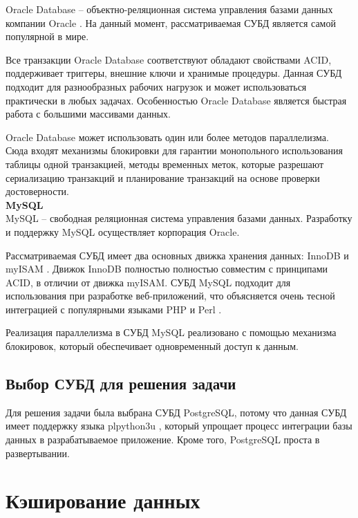 Oracle Database \cite{oracle} -- объектно-реляционная система управления базами данных компании Oracle \cite{oracle-company}. На данный момент, рассматриваемая СУБД является самой популярной в мире. \cite{oracle-popular}

Все транзакции Oracle Database соответствуют обладают свойствами ACID, поддерживает триггеры, внешние ключи и хранимые процедуры. Данная СУБД подходит для разнообразных рабочих нагрузок и может использоваться практически в любых задачах. Особенностью Oracle Database является быстрая работа с большими массивами данных.

Oracle Database может использовать один или более методов параллелизма. Сюда входят механизмы блокировки для гарантии монопольного использования таблицы одной транзакцией, методы временных меток, которые разрешают сериализацию транзакций и планирование транзакций на основе проверки достоверности. \\

\noindent\textbf{MySQL}\\

MySQL \cite{mysql} -- свободная реляционная система управления базами данных. Разработку и поддержку MySQL осуществляет корпорация Oracle.

Рассматриваемая СУБД имеет два основных движка хранения данных: InnoDB \cite{innodb} и myISAM \cite{myisam}. Движок InnoDB полностью полностью совместим с принципами ACID, в отличии от движка myISAM. СУБД MySQL подходит  для использования при разработке веб-приложений, что объясняется очень тесной интеграцией с популярными языками PHP \cite{php} и Perl \cite{perl}.

Реализация параллелизма в СУБД MySQL реализовано с помощью механизма блокировок, который обеспечивает одновременный доступ к данным.

\subsection{Выбор СУБД для решения задачи}

Для решения задачи была выбрана СУБД PostgreSQL, потому что данная СУБД имеет поддержку языка plpython3u \cite{plpython3u}, который упрощает процесс интеграции базы данных в разрабатываемое приложение. Кроме того, PostgreSQL проста в развертывании.

\section{Кэширование данных}

